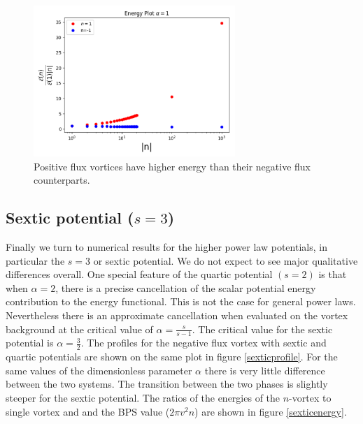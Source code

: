 \begin{figure}[H]
\begin{center}
 \includegraphics[width=3in]{Chapter_2_Folder_1912.11321/figures/positive_n_energy.pdf}
     \caption[\textcolor{red}{Energy per flux for positive $n$.}]{{\small Positive flux vortices have higher energy than their negative flux counterparts.}} \label{positiveenergy}
    \end{center}
\end{figure}
\subsection{Sextic potential ($s=3$)}
Finally we turn to numerical results for the higher power law potentials, in particular the $s=3$
or sextic potential. We do not expect to see major qualitative differences overall. One special feature of the quartic potential $(s=2)$ is that when $\alpha=2$, there is a precise cancellation of the scalar potential energy contribution to the energy functional. This is not the case for general power laws. Nevertheless there is an approximate cancellation when evaluated on the vortex background at the critical value of $\alpha = \frac{s}{s-1}$.   The critical value for the sextic potential is $\alpha = \frac32$.
The profiles for the negative flux vortex with sextic and quartic potentials are shown on the same plot in figure \ref{sexticprofile}. For the same values of the dimensionless parameter $\alpha$ there is very little difference between the two systems. The transition between the two phases is slightly steeper for the sextic potential. The ratios of the energies of the $n$-vortex to single vortex and and the BPS value ($2\pi v^2 n$) are shown in figure 
\ref{sexticenergy}.

